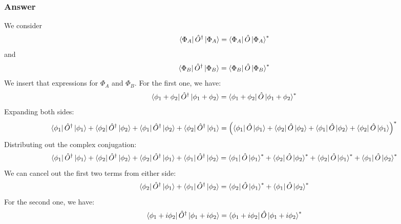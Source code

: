 \documentclass{article}
\begin{document}
\subsubsection{Answer}
We consider
\begin{equation}
    \bra{\Phi _{A}}\hat{O}^\dagger\ket{\Phi _{A}}= \bra{\Phi _{A}} \hat{O}\ket{\Phi _{A}}^*
\end{equation}
and
\begin{equation}
    \bra{\Phi _{B}}\hat{O}^\dagger\ket{\Phi _{B}}= \bra{\Phi _{B}} \hat{O}\ket{\Phi _{B}}^*
\end{equation}
We insert that expressions for $\Phi_A$ and $\Phi_B$. For the first one, we have:
\begin{equation}
    \bra{\phi _{1} + \phi _{2}}\hat{O}^\dagger\ket{\phi _{1} + \phi _{2}}= \bra{\phi _{1} + \phi _{2}} \hat{O}\ket{\phi _{1} + \phi _{2}}^*
\end{equation}
Expanding both sides:
\begin{equation}
    \bra{\phi _{1}}\hat{O}^\dagger\ket{\phi _{1}} + \bra{\phi _{2}}\hat{O}^\dagger\ket{\phi _{2}} + \bra{\phi _{1}}\hat{O}^\dagger\ket{\phi _{2}} + \bra{\phi _{2}}\hat{O}^\dagger\ket{\phi _{1}} = \left(\bra{\phi _{1}} \hat{O}\ket{\phi _{1}} + \bra{\phi _{2}} \hat{O}\ket{\phi _{2}} + \bra{\phi _{1}} \hat{O}\ket{\phi _{2}} + \bra{\phi _{2}} \hat{O}\ket{\phi _{1}}\right)^*
\end{equation}
Distributing out the complex conjugation:
\begin{equation}
    \bra{\phi _{1}}\hat{O}^\dagger\ket{\phi _{1}} + \bra{\phi _{2}}\hat{O}^\dagger\ket{\phi _{2}} + \bra{\phi _{2}}\hat{O}^\dagger\ket{\phi _{1}} + \bra{\phi _{1}}\hat{O}^\dagger\ket{\phi _{2}} = \bra{\phi _{1}} \hat{O}\ket{\phi _{1}}^* + \bra{\phi _{2}} \hat{O}\ket{\phi _{2}}^* + \bra{\phi _{2}} \hat{O}\ket{\phi _{1}}^* + \bra{\phi _{1}} \hat{O}\ket{\phi _{2}}^*
\end{equation}
We can cancel out the first two terms from either side:
\begin{equation}
    \bra{\phi _{2}}\hat{O}^\dagger\ket{\phi _{1}} + \bra{\phi _{1}}\hat{O}^\dagger\ket{\phi _{2}} = \bra{\phi _{2}} \hat{O}\ket{\phi _{1}}^* + \bra{\phi _{1}} \hat{O}\ket{\phi _{2}}^*
\end{equation}
For the second one, we have:
\begin{equation}
    \bra{\phi _{1} + i\phi _{2}}\hat{O}^\dagger\ket{\phi _{1} + i\phi _{2}}= \bra{\phi _{1} + i\phi _{2}} \hat{O}\ket{\phi _{1} + i\phi _{2}}^*
\end{equation}
\end{document}
